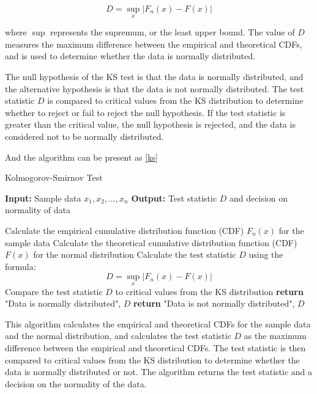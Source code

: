 \documentclass[twocolumn]{article}
\begin{document}
\begin{equation}
D = \sup_{x} \left| F_{n}(x) - F(x) \right|
\end{equation}

where $\sup$ represents the supremum, or the least upper bound. The value of $D$ measures the maximum difference between the empirical and theoretical CDFs, and is used to determine whether the data is normally distributed.

The null hypothesis of the KS test is that the data is normally distributed, and the alternative hypothesis is that the data is not normally distributed. The test statistic $D$ is compared to critical values from the KS distribution to determine whether to reject or fail to reject the null hypothesis. If the test statistic is greater than the critical value, the null hypothesis is rejected, and the data is considered not to be normally distributed.

And the algorithm can be present as \ref{ks}

\begin{algorithm}[htbp]
\caption{Kolmogorov-Smirnov Test}
\begin{algorithmic}[1]
\State \textbf{Input:} Sample data $x_1, x_2, \dots, x_n$
\State \textbf{Output:} Test statistic $D$ and decision on normality of data

\State Calculate the empirical cumulative distribution function (CDF) $F_{n}(x)$ for the sample data
\State Calculate the theoretical cumulative distribution function (CDF) $F(x)$ for the normal distribution
\State Calculate the test statistic $D$ using the formula:
\begin{equation}
D = \sup_{x} \left| F_{n}(x) - F(x) \right|
\end{equation}
\State Compare the test statistic $D$ to critical values from the KS distribution
\State \textbf{return} "Data is normally distributed", $D$
\Else
\State \textbf{return} "Data is not normally distributed", $D$
\EndIf
\end{algorithmic}
\end{algorithm}

This algorithm calculates the empirical and theoretical CDFs for the sample data and the normal distribution, and calculates the test statistic $D$ as the maximum difference between the empirical and theoretical CDFs. The test statistic is then compared to critical values from the KS distribution to determine whether the data is normally distributed or not. The algorithm returns the test statistic and a decision on the normality of the data.
\end{document}
